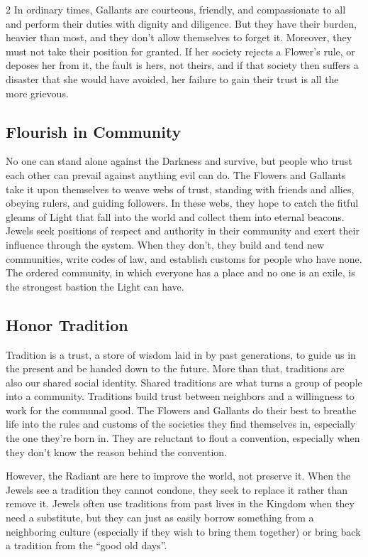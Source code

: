 \begin{multicols}{2}
In ordinary times, Gallants are courteous, friendly, and compassionate to all and perform their duties with dignity and diligence. But they have their burden, heavier than most, and they don't allow themselves to forget it. Moreover, they must not take their position for granted. If her society rejects a Flower's rule, or deposes her from it, the fault is hers, not theirs, and if that society then suffers a disaster that she would have avoided, her failure to gain their trust is all the more grievous.

\subsection*{Flourish in Community}

No one can stand alone against the Darkness and survive, but people who trust each other can prevail against anything evil can do. The Flowers and Gallants take it upon themselves to weave webs of trust, standing with friends and allies, obeying rulers, and guiding followers. In these webs, they hope to catch the fitful gleams of Light that fall into the world and collect them into eternal beacons. Jewels seek positions of respect and authority in their community and exert their influence through the system. When they don't, they build and tend new communities, write codes of law, and establish customs for people who have none. The ordered community, in which everyone has a place and no one is an exile, is the strongest bastion the Light can have.

\subsection*{Honor Tradition}

Tradition is a trust, a store of wisdom laid in by past generations, to guide us in the present and be handed down to the future. More than that, traditions are also our shared social identity. Shared traditions are what turns a group of people into a community. Traditions build trust between neighbors and a willingness to work for the communal good. The Flowers and Gallants do their best to breathe life into the rules and customs of the societies they find themselves in, especially the one they're born in. They are reluctant to flout a convention, especially when they don't know the reason behind the convention. 

However, the Radiant are here to improve the world, not preserve it. When the Jewels see a tradition they cannot condone, they seek to replace it rather than remove it. Jewels often use traditions from past lives in the Kingdom when they need a substitute, but they can just as easily borrow something from a neighboring culture (especially if they wish to bring them together) or bring back a tradition from the \textquotedblleft good old days\textquotedblright.


\end{multicols}
